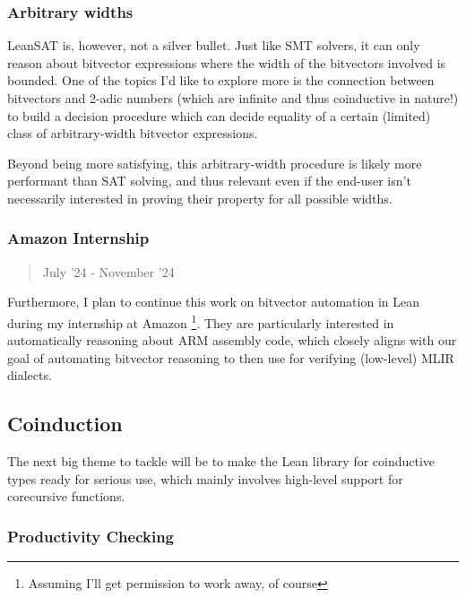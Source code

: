\documentclass[a4paper]{article}
\begin{document}
\hypertarget{arbitrary-widths}{%
\subsubsection{Arbitrary widths}\label{arbitrary-widths}}

LeanSAT is, however, not a silver bullet. Just like SMT solvers, it can
only reason about bitvector expressions where the width of the
bitvectors involved is bounded. One of the topics I'd like to explore
more is the connection between bitvectors and 2-adic numbers (which are
infinite and thus coinductive in nature!) to build a decision procedure
which can decide equality of a certain (limited) class of
arbitrary-width bitvector expressions.

Beyond being more satisfying, this arbitrary-width procedure is likely
more performant than SAT solving, and thus relevant even if the end-user
isn't necessarily interested in proving their property for all possible
widths.

\hypertarget{amazon-internship}{%
\subsubsection{Amazon Internship}\label{amazon-internship}}

\begin{quote}
July '24 - November '24
\end{quote}

Furthermore, I plan to continue this work on bitvector automation in
Lean during my internship at Amazon \footnote{ Assuming I'll get
  permission to work away, of course}. They are particularly interested
in automatically reasoning about ARM assembly code, which closely aligns
with our goal of automating bitvector reasoning to then use for
verifying (low-level) MLIR dialects.

\hypertarget{coinduction}{%
\subsection{Coinduction}\label{coinduction}}

The next big theme to tackle will be to make the Lean library for
coinductive types ready for serious use, which mainly involves
high-level support for corecursive functions.

\hypertarget{productivity-checking}{%
\subsubsection{Productivity Checking}\label{productivity-checking}}
\end{document}
